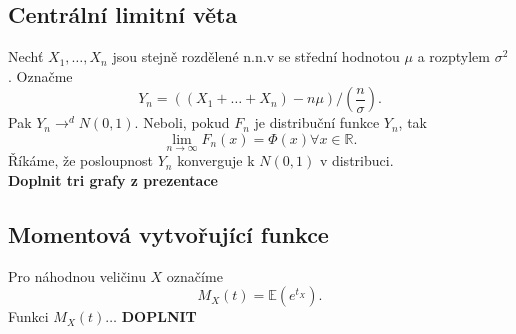 \documentclass[../main.tex]{subfiles}
\begin{document}
\subsection{Centrální limitní věta}
\begin{theorem}
    Nechť $X_1,\dots,X_n$ jsou stejně rozdělené n.n.v se střední hodnotou $\mu$ a rozptylem $\sigma^2$. Označme
    \[Y_n = ((X_1 + \dots + X_n) - n\mu)/(\frac{n}\sigma).\]
    Pak $Y_n \rightarrow^d N(0,1)$. Neboli, pokud $F_n$ je distribuční funkce $Y_n$, tak
    \[\lim_{n \rightarrow \infty}F_n(x) = \Phi(x) \forall x\in \mathbb{R}.\]
    Říkáme, že posloupnost $Y_n$ konverguje k $N(0,1)$ v distribuci.
    \\ \textbf{Doplnit tri grafy z prezentace}
\end{theorem}

\subsection{Momentová vytvořující funkce}
\begin{definition}
    Pro náhodnou veličinu $X$ označíme
    \[M_X(t) = \mathbb{E}(e^{t_{X}}).\]
    Funkci $M_X(t)\dots$
    \textbf{DOPLNIT}
\end{definition}
\end{document}
